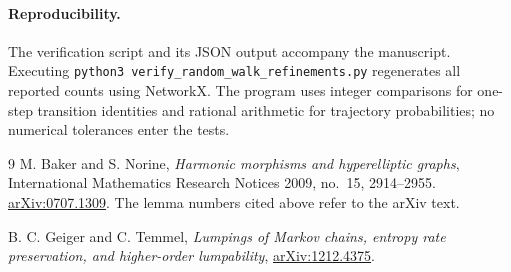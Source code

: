 \documentclass[11pt]{article}
\theoremstyle{definition}
\numberwithin{equation}{section}
\begin{document}
\paragraph{Reproducibility.}
The verification script and its JSON output accompany the manuscript.
Executing \texttt{python3 verify\_random\_walk\_refinements.py} regenerates
all reported counts using NetworkX. The program uses integer comparisons
for one-step transition identities and rational arithmetic for trajectory
probabilities; no numerical tolerances enter the tests.

\begin{thebibliography}{9}
M. Baker and S. Norine,
\emph{Harmonic morphisms and hyperelliptic graphs},
International Mathematics Research Notices 2009, no.~15, 2914--2955.
\href{https://arxiv.org/abs/0707.1309}{arXiv:0707.1309}.
The lemma numbers cited above refer to the arXiv text.

B. C. Geiger and C. Temmel,
\emph{Lumpings of Markov chains, entropy rate preservation, and higher-order
lumpability},
\href{https://arxiv.org/abs/1212.4375}{arXiv:1212.4375}.
\end{thebibliography}
\end{document}
